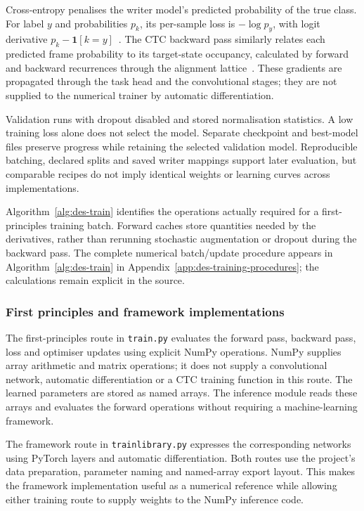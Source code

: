 Cross-entropy penalises the writer model's predicted probability of the true class. For label $y$ and probabilities $p_k$, its per-sample loss is $-\log p_y$, with logit derivative $p_k-\mathbf{1}[k=y]$~\cite[p.~6, Eqs.~(13)--(14)]{graves2013}. The CTC backward pass similarly relates each predicted frame probability to its target-state occupancy, calculated by forward and backward recurrences through the alignment lattice~\cite[PDF pp.~4--6]{graves2006}. These gradients are propagated through the task head and the convolutional stages; they are not supplied to the numerical trainer by automatic differentiation.

Validation runs with dropout disabled and stored normalisation statistics. A low training loss alone does not select the model. Separate checkpoint and best-model files preserve progress while retaining the selected validation model. Reproducible batching, declared splits and saved writer mappings support later evaluation, but comparable recipes do not imply identical weights or learning curves across implementations.

Algorithm~\ref{alg:des-train} identifies the operations actually required for a first-principles training batch. Forward caches store quantities needed by the derivatives, rather than rerunning stochastic augmentation or dropout during the backward pass.
The complete numerical batch/update procedure appears in Algorithm~\ref{alg:des-train} in Appendix~\ref{app:des-training-procedures}; the calculations remain explicit in the source.

\subsubsection{First principles and framework implementations}
\label{sec:des-implementations}
The first-principles route in \texttt{train.py} evaluates the forward pass, backward pass, loss and optimiser updates using explicit NumPy operations. NumPy supplies array arithmetic and matrix operations; it does not supply a convolutional network, automatic differentiation or a CTC training function in this route. The learned parameters are stored as named arrays. The inference module reads these arrays and evaluates the forward operations without requiring a machine-learning framework.


The framework route in \texttt{trainlibrary.py} expresses the corresponding networks using PyTorch layers and automatic differentiation. Both routes use the project's data preparation, parameter naming and named-array export layout. This makes the framework implementation useful as a numerical reference while allowing either training route to supply weights to the NumPy inference code.

